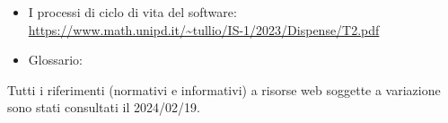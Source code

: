         \begin{itemize}
            \item I processi di ciclo di vita del software: \\
            \url{https://www.math.unipd.it/~tullio/IS-1/2023/Dispense/T2.pdf}
            \item Glossario: \\
            \url{} %
        \end{itemize}

        Tutti i riferimenti (normativi e informativi) a risorse web soggette a variazione sono stati consultati il 2024/02/19.